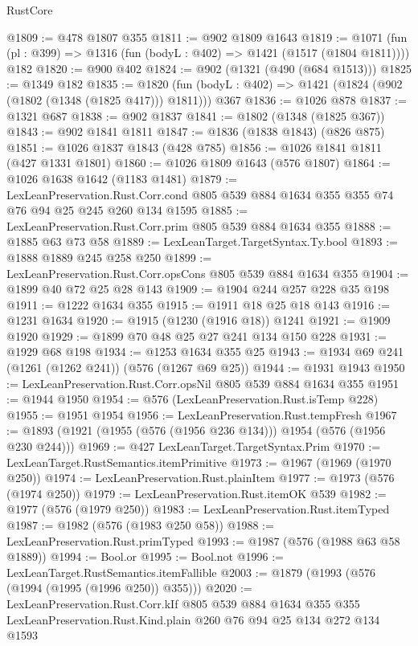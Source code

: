 \begin{lexlean}{RustCore}
\begin{coremodule}
@1809 := @478 @1807 @355
@1811 := @902 @1809 @1643
@1819 := @1071 (fun (pl : @399) => @1316 (fun (bodyL : @402) => @1421 (@1517 (@1804 @1811)))) @182
@1820 := @900 @402
@1824 := @902 (@1321 (@490 (@684 @1513)))
@1825 := @1349 @182
@1835 := @1820 (fun (bodyL : @402) => @1421 (@1824 (@902 (@1802 (@1348 (@1825 @417))) @1811))) @367
@1836 := @1026 @878
@1837 := @1321 @687
@1838 := @902 @1837
@1841 := @1802 (@1348 (@1825 @367))
@1843 := @902 @1841 @1811
@1847 := @1836 (@1838 @1843) (@826 @875)
@1851 := @1026 @1837 @1843 (@428 @785)
@1856 := @1026 @1841 @1811 (@427 @1331 @1801)
@1860 := @1026 @1809 @1643 (@576 @1807)
@1864 := @1026 @1638 @1642 (@1183 @1481)
@1879 := LexLeanPreservation.Rust.Corr.cond
    @805
    @539
    @884
    @1634
    @355
    @355
    @74
    @76
    @94
    @25
    @245
    @260
    @134
    @1595
@1885 := LexLeanPreservation.Rust.Corr.prim @805 @539 @884 @1634 @355
@1888 := @1885 @63 @73 @58
@1889 := LexLeanTarget.TargetSyntax.Ty.bool
@1893 := @1888 @1889 @245 @258 @250
@1899 := LexLeanPreservation.Rust.Corr.opsCons @805 @539 @884 @1634 @355
@1904 := @1899 @40 @72 @25 @28 @143
@1909 := @1904 @244 @257 @228 @35 @198
@1911 := @1222 @1634 @355
@1915 := @1911 @18 @25 @18 @143
@1916 := @1231 @1634
@1920 := @1915 (@1230 (@1916 @18)) @1241
@1921 := @1909 @1920
@1929 := @1899 @70 @48 @25 @27 @241 @134 @150 @228
@1931 := @1929 @68 @198
@1934 := @1253 @1634 @355 @25
@1943 := @1934 @69 @241 (@1261 (@1262 @241)) (@576 (@1267 @69 @25))
@1944 := @1931 @1943
@1950 := LexLeanPreservation.Rust.Corr.opsNil @805 @539 @884 @1634 @355
@1951 := @1944 @1950
@1954 := @576 (LexLeanPreservation.Rust.isTemp @228)
@1955 := @1951 @1954
@1956 := LexLeanPreservation.Rust.tempFresh
@1967 := @1893 (@1921 (@1955 (@576 (@1956 @236 @134))) @1954 (@576 (@1956 @230 @244)))
@1969 := @427 LexLeanTarget.TargetSyntax.Prim
@1970 := LexLeanTarget.RustSemantics.itemPrimitive
@1973 := @1967 (@1969 (@1970 @250))
@1974 := LexLeanPreservation.Rust.plainItem
@1977 := @1973 (@576 (@1974 @250))
@1979 := LexLeanPreservation.Rust.itemOK @539
@1982 := @1977 (@576 (@1979 @250))
@1983 := LexLeanPreservation.Rust.itemTyped
@1987 := @1982 (@576 (@1983 @250 @58))
@1988 := LexLeanPreservation.Rust.primTyped
@1993 := @1987 (@576 (@1988 @63 @58 @1889))
@1994 := Bool.or
@1995 := Bool.not
@1996 := LexLeanTarget.RustSemantics.itemFallible
@2003 := @1879 (@1993 (@576 (@1994 (@1995 (@1996 @250)) @355)))
@2020 := LexLeanPreservation.Rust.Corr.kIf
    @805
    @539
    @884
    @1634
    @355
    @355
    LexLeanPreservation.Rust.Kind.plain
    @260
    @76
    @94
    @25
    @134
    @272
    @134
    @1593

\end{coremodule}
\end{lexlean}
